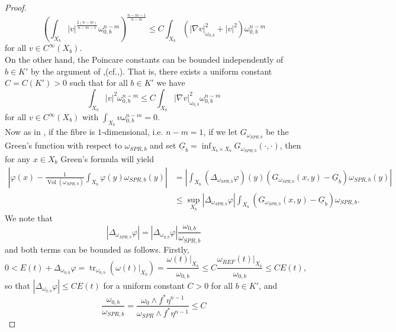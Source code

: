 \documentclass[12pt]{article}
\numberwithin{equation}{section}
\DeclareMathOperator{\tr}{tr}
\DeclareMathOperator{\Vol}{Vol}
\begin{document}
\begin{proof}
\begin{equation*}
    \left(\int_{X_b} |v|^{\frac{2(n-m)}{n-m-1}} \omega_{0,b}^{n-m} \right)^{\frac{n-m-1}{n-m}} \leq C \int_{X_b} (|\nabla v|_{\omega_{0,b}}^2 + |v|^2) \omega_{0,b}^{n-m}
\end{equation*}
for all $v \in C^\infty(X_b)$.\\
On the other hand, the Poincare constants can be bounded independently of $b \in K'$ by the argument of \cite[Lem. 3.4]{T10},(cf.\cite{T07},\cite{LY86}). That is, there exists a uniform constant $C = C(K') > 0 $ such that for all $b \in K'$ we have
\begin{equation*}
    \int_{X_b} |v|^2 \omega_{0,b}^{n-m} \leq C \int_{X_b} |\nabla v|_{\omega_{0,b}}^2 \omega_{0,b}^{n-m}
\end{equation*}
for all $v \in C^\infty(X_b)$ with $\int_{X_b} v \omega_{0,b}^{n-m} = 0$.\\
Now as in \cite{ZZ20, ST07}, if the fibre is $1$-dimensional, i.e. $n-m =1$, if we let $G_{\omega_{SPR,b}}$ be the Green's function with respect to $\omega_{SPR,b}$ and set $\underline{G}_b = \inf_{X_b \times X_b} G_{\omega_{SPR,b}}(\cdot,\cdot)$, then for any $x \in X_b$ Green's formula will yield
\begin{align*}
    \left|\varphi(x) - \frac{1}{\Vol(\omega_{SPR,b})}\int_{X_b} \varphi(y) \omega_{SPR,b}(y)\right| &= \left|\int_{X_b} (\Delta_{\omega_{SPR,b}} \varphi)(y) (G_{\omega_{SPR,b}}(x,y) - \underline{G}_b)\omega_{SPR,b}(y)\right|\\
    &\leq \sup_{X_b} |\Delta_{\omega_{SPR,b}} \varphi| \int_{X_b} (G_{\omega_{SPR,b}}(x,y) - \underline{G}_b) \omega_{SPR,b}.
\end{align*}
We note that
\begin{equation*}
    |\Delta_{\omega_{SPR,b}} \varphi| = |\Delta_{\omega_{0,b}} \varphi| \frac{\omega_{0,b}}{\omega_{SPR,b}}
\end{equation*}
and both terms can be bounded as follows. Firstly,
\begin{equation*}
    0 < E(t) + \Delta_{\omega_{0,b}} \varphi = \tr_{\omega_{0,b}} (\omega(t)|_{X_b}) = \frac{\omega(t)|_{X_b}}{\omega_{0,b}} \leq C \frac{\omega_{REF}(t)|_{X_b}}{\omega_{0,b}} \leq CE(t),
\end{equation*}
so that $|\Delta_{\omega_{0,b}} \varphi| \leq CE(t)$ for a uniform constant $C>0$ for all $b \in K'$, and 
\begin{equation*}
    \frac{\omega_{0,b}}{\omega_{SPR,b}} = \frac{\omega_0 \wedge f^*\eta^{n-1}}{\omega_{SPR} \wedge f^*\eta^{n-1}} \leq C

\end{equation*}
\end{proof}
\end{document}
